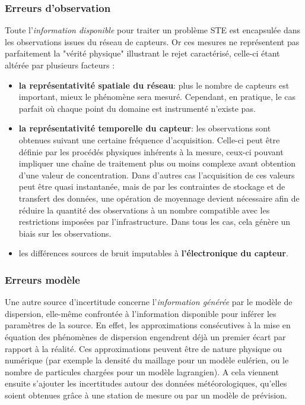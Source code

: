 	\subsubsection{Erreurs d'observation}
	Toute l'\textit{information disponible} pour traiter un problème STE est encapsulée dans les observations issues du réseau de capteurs. Or ces mesures ne représentent pas parfaitement la "vérité physique" illustrant le rejet caractérisé, celle-ci étant altérée par plusieurs facteurs : \\
	
	\begin{itemize}
		\item \textbf{la représentativité spatiale du réseau}: plus le nombre de capteurs est important, mieux le phénomène sera mesuré. Cependant, en pratique, le cas parfait où chaque point du domaine est instrumenté n'existe pas.
		\item \textbf{la représentativité temporelle du capteur}: les observations sont obtenues suivant une certaine fréquence d'acquisition. Celle-ci peut être définie par les procédés physiques inhérents à la mesure, ceux-ci pouvant impliquer une chaîne de traitement plus ou moins complexe avant obtention d'une valeur de concentration. Dans d'autres cas l'acquisition de ces valeurs peut être quasi instantanée, mais de par les contraintes de stockage et de transfert des données, une opération de moyennage devient nécessaire afin de réduire la quantité des observations à un nombre compatible avec les restrictions imposées par l'infrastructure. Dans tous les cas, cela génère un biais sur les observations.
		\item les différences sources de bruit imputables à \textbf{l'électronique du capteur}.\\
	\end{itemize}
	
	\subsubsection{Erreurs modèle}
	Une autre source d'incertitude concerne l'\textit{information générée} par le modèle de dispersion, elle-même confrontée à l'information disponible pour inférer les paramètres de la source. En effet, les approximations consécutives à la mise en équation des phénomènes de dispersion engendrent déjà un premier écart par rapport à la réalité. Ces approximations peuvent être de nature physique ou numérique (par exemple la densité du maillage pour un modèle eulérien, ou le nombre de particules chargées pour un modèle lagrangien). A cela viennent ensuite s'ajouter les incertitudes autour des données météorologiques, qu'elles soient obtenues grâce à une station de mesure ou par un modèle de prévision. \\
	
